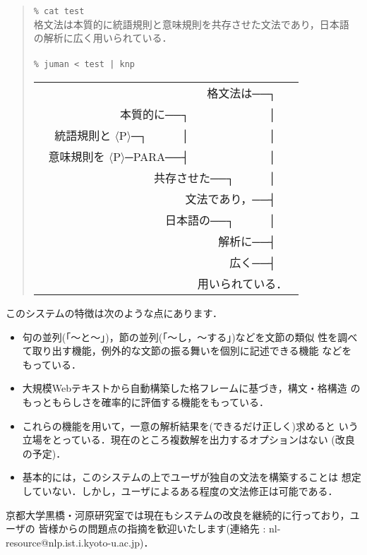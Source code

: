 \documentclass[a4j,11pt,titlepage]{jarticle}
\def\fl{$\langle$}
\def\fr{$\rangle$}
\begin{document}
\begin{quote}
\texttt{\% cat test} \\
格文法は本質的に統語規則と意味規則を共存させた文法であり，日本語 \\
の解析に広く用いられている．\\
 \\
\texttt{\% juman < test | knp} \\
\begin{tabular}[t]{r}
　　　　　　　　　　　　　　格文法は──┐　\ \\[-4pt]
　　　　　　本質的に──┐　　　　　　　│　\ \\[-4pt]
統語規則と \fl P\fr ─┐　　　│　　　　　　　│　\ \\[-4pt]
意味規則を \fl P\fr ─PARA──┤　　　　　　　│　\ \\[-4pt]
　　　　　　　　　共存させた──┐　　　│　\ \\[-4pt]
　　　　　　　　　　　　文法であり，──┤　\ \\[-4pt]
　　　　　　　　　　日本語の──┐　　　│　\ \\[-4pt]
　　　　　　　　　　　　　　　解析に──┤　\ \\[-4pt]
　　　　　　　　　　　　　　　　広く──┤　\ \\[-4pt]
　　　　　　　　　　　　　　用いられている．\ \\
\end{tabular}
\end{quote}

このシステムの特徴は次のような点にあります．

\begin{itemize}
\item 句の並列(「〜と〜」)，節の並列(「〜し，〜する」)などを文節の類似
  性を調べて取り出す機能，例外的な文節の振る舞いを個別に記述できる機能
  などをもっている．
\item 大規模Webテキストから自動構築した格フレームに基づき，構文・格構造
      のもっともらしさを確率的に評価する機能をもっている．
\item これらの機能を用いて，一意の解析結果を(できるだけ正しく)求めると
  いう立場をとっている．現在のところ複数解を出力するオプションはない
  (改良の予定)．
\item 基本的には，このシステムの上でユーザが独自の文法を構築することは
  想定していない．しかし，ユーザによるある程度の文法修正は可能である．
\end{itemize}

京都大学黒橋・河原研究室では現在もシステムの改良を継続的に行っており，ユーザの
皆様からの問題点の指摘を歓迎いたします(連絡先 : {\sf
nl-resource@nlp.ist.i.kyoto-u.ac.jp})．
\end{document}

